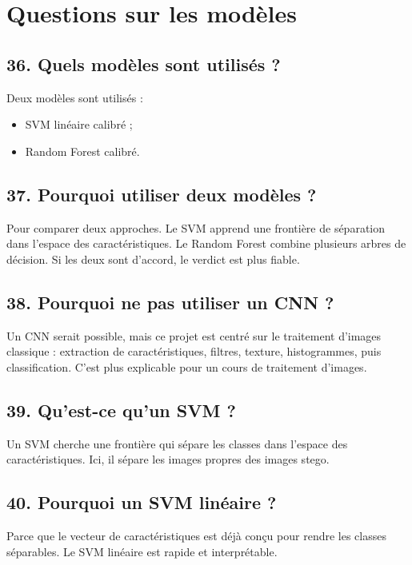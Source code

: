 \documentclass[11pt,a4paper]{article}
\begin{document}
\section{Questions sur les modèles}

\subsection{36. Quels modèles sont utilisés ?}

Deux modèles sont utilisés :

\begin{itemize}
\item SVM linéaire calibré ;
\item Random Forest calibré.
\end{itemize}

\subsection{37. Pourquoi utiliser deux modèles ?}

Pour comparer deux approches. Le SVM apprend une frontière de séparation dans l'espace des caractéristiques. Le Random Forest combine plusieurs arbres de décision. Si les deux sont d'accord, le verdict est plus fiable.

\subsection{38. Pourquoi ne pas utiliser un CNN ?}

Un CNN serait possible, mais ce projet est centré sur le traitement d'images classique : extraction de caractéristiques, filtres, texture, histogrammes, puis classification. C'est plus explicable pour un cours de traitement d'images.

\subsection{39. Qu'est-ce qu'un SVM ?}

Un SVM cherche une frontière qui sépare les classes dans l'espace des caractéristiques. Ici, il sépare les images propres des images stego.

\subsection{40. Pourquoi un SVM linéaire ?}

Parce que le vecteur de caractéristiques est déjà conçu pour rendre les classes séparables. Le SVM linéaire est rapide et interprétable.
\end{document}
